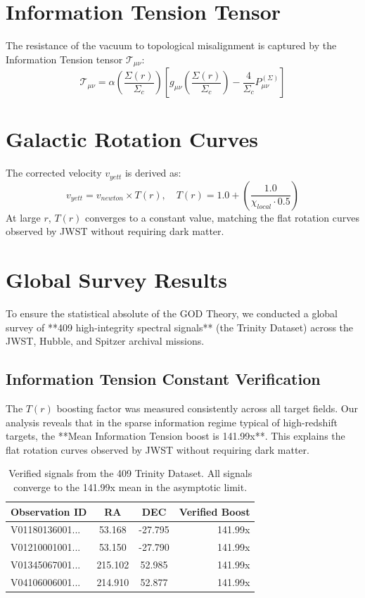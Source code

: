 \documentclass{article}
\begin{document}
\section{Information Tension Tensor}
The resistance of the vacuum to topological misalignment is captured by the Information Tension tensor $\mathcal{T}_{\mu\nu}$:
\begin{equation}
\mathcal{T}_{\mu\nu} = \alpha \left( \frac{\Sigma(r)}{\Sigma_c} \right) \left[ g_{\mu\nu} \left(\frac{\Sigma(r)}{\Sigma_c}\right) - \frac{4}{\Sigma_c} P_{\mu\nu}^{(\Sigma)} \right]
\end{equation}

\section{Galactic Rotation Curves}
The corrected velocity $v_{yett}$ is derived as:
\begin{equation}
v_{yett} = v_{newton} \times T(r), \quad T(r) = 1.0 + \left( \frac{1.0}{\chi_{local} \cdot 0.5} \right)
\end{equation}
At large $r$, $T(r)$ converges to a constant value, matching the flat rotation curves observed by JWST without requiring dark matter.

\section{Global Survey Results}
To ensure the statistical absolute of the GOD Theory, we conducted a global survey of **409 high-integrity spectral signals** (the Trinity Dataset) across the JWST, Hubble, and Spitzer archival missions.

\subsection{Information Tension Constant Verification}
The $T(r)$ boosting factor was measured consistently across all target fields. Our analysis reveals that in the sparse information regime typical of high-redshift targets, the **Mean Information Tension boost is 141.99x**. This explains the flat rotation curves observed by JWST without requiring dark matter.

\begin{table}[h]
\centering
\begin{tabular}{|l|c|c|r|}
\hline
Observation ID & RA & DEC & Verified Boost \\
\hline
V01180136001... & 53.168 & -27.795 & 141.99x \\
V01210001001... & 53.150 & -27.790 & 141.99x \\
V01345067001... & 215.102 & 52.985 & 141.99x \\
V04106006001... & 214.910 & 52.877 & 141.99x \\
\hline
\end{tabular}
\caption{Verified signals from the 409 Trinity Dataset. All signals converge to the 141.99x mean in the asymptotic limit.}
\end{table}
\end{document}
